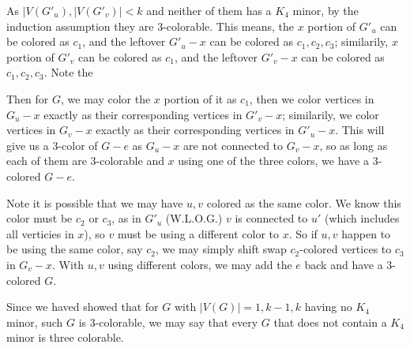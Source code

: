\documentclass[11pt]{article}
\begin{document}
As $|V(G'_u), |V(G'_v)| < k$ and neither of them has a $K_4$ minor, by the induction assumption they are 3-colorable. This means, the $x$ portion of $G'_u$ can be colored as $c_1$, and the leftover $G'_u - x$ can be colored as $c_1, c_2, c_3$; similarily,  $x$ portion of $G'_v$ can be colored as $c_1$, and the leftover $G'_v - x$ can be colored as $c_1, c_2, c_3$. Note the

Then for $G$, we may color the $x$ portion of it as $c_1$, then we color vertices in $G_u - x$ exactly as their corresponding vertices in $G'_v - x$; similarily, we color vertices in $G_v - x$ exactly as their corresponding vertices in $G'_u - x$. This will give us a 3-color of $G-e$ as $G_u - x$ are not connected to $G_v - x$, so as long as each of them are 3-colorable and $x$ using one of the three colors, we have a 3-colored $G-e$.

Note it is possible that we may have $u, v$ colored as the same color. We know this color must be $c_2$ or $c_3$, as in $G'_u$ (W.L.O.G.) $v$ is connected to $u'$ (which includes all verticies in $x$), so $v$ must be using a different color to $x$. So if $u, v$ happen to be using the same color, say $c_2$, we may simply shift swap $c_2$-colored vertices to $c_3$ in $G_v - x$. With $u, v$ using different colors, we may add the $e$ back and have a 3-colored $G$.\newline

Since we haved showed that for $G$ with $|V(G)| = 1, k-1, k$ having no $K_4$ minor, such $G$ is 3-colorable, we may say that every $G$ that does not contain a $K_4$ minor is three colorable.



\end{document}
